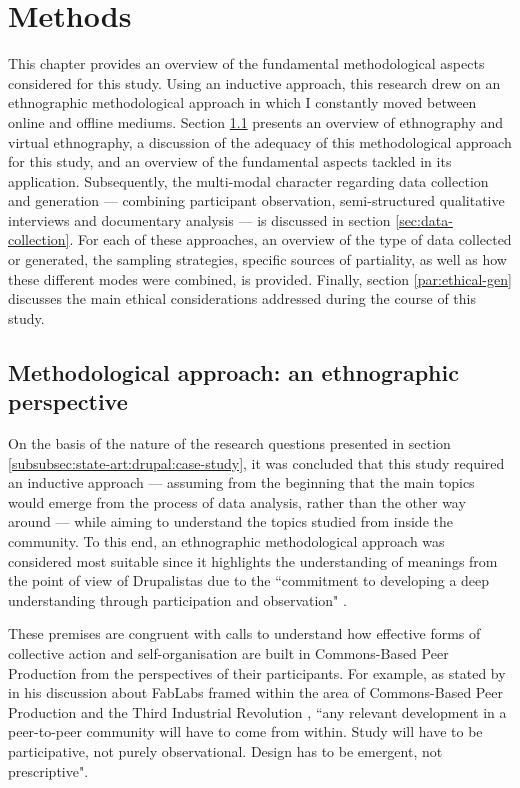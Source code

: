 \chapter{Methods}
\label{chapter:methods}

This chapter provides an overview of the fundamental methodological aspects considered for this study. Using an inductive approach, this research drew on an ethnographic methodological approach in which I constantly moved between online and offline mediums. Section \ref{sec:ethnography} presents an overview of ethnography and virtual ethnography, a discussion of the adequacy of this methodological approach for this study, and an overview of the fundamental aspects tackled in its application. Subsequently, the multi-modal character regarding data collection and generation --- combining participant observation, semi-structured qualitative interviews and documentary analysis --- is discussed in section \ref{sec:data-collection}. For each of these approaches, an overview of the type of data collected or generated, the sampling strategies, specific sources of partiality, as well as how these different modes were combined, is provided. Finally, section \ref{par:ethical-gen} discusses the main ethical considerations addressed during the course of this study.

\section{Methodological approach: an ethnographic perspective}
\label{sec:ethnography}

On the basis of the nature of the research questions presented in section \ref{subsubsec:state-art:drupal:case-study}, it was concluded that this study required an inductive approach --- assuming from the beginning that the main topics would emerge from the process of data analysis, rather than the other way around --- while aiming to understand the topics studied from inside the community. To this end, an ethnographic methodological approach was considered most suitable since it highlights the understanding of meanings from the point of view of Drupalistas due to the ``commitment to developing a deep understanding through participation and observation" \parencite[41]{hine2000virtualbook}.

These premises are congruent with calls to understand how effective forms of collective action and self-organisation are built in Commons-Based Peer Production from the perspectives of their participants. For example, as stated by \textcite[191]{troxler2014making} in his discussion about FabLabs framed within the area of Commons-Based Peer Production and the Third Industrial Revolution \parencite{rifkin2012third}, ``any relevant development in a peer-to-peer community will have to come from within. Study will have to be participative, not purely observational. Design has to be emergent, not prescriptive".


